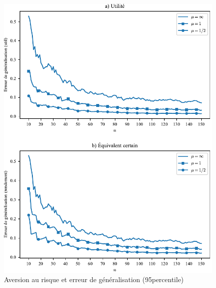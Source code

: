 \begin{figure}[h!]
  \centering
  \includegraphics[width=\textwidth]{../../experiments/fig/avrisk_gen.pdf}
  \caption[Aversion au risque et erreur de généralisation]{Aversion au risque et erreur de
    généralisation (95\ieme percentile)}
  \label{fig_avrisk_gen}
\end{figure}



